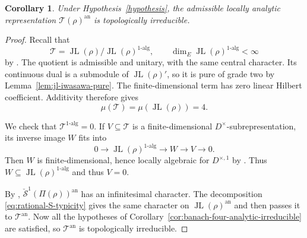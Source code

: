 \documentclass[11pt]{article}
\newtheorem{corollary}[theorem]{Corollary}
\theoremstyle{definition}
\newcommand{\JL}{\operatorname{JL}}
\newcommand{\Tau}{\mathcal T}
\begin{document}
\begin{corollary}\label{thm:tau-analytic-irreducible}
Under Hypothesis~\ref{hypothesis}, the admissible
locally analytic representation $\Tau(\rho)^{\mathrm{an}}$ is
topologically irreducible.
\end{corollary}
\begin{proof}
Recall that
\[
 \Tau=\JL(\rho)/\JL(\rho)^{1\text{-}\mathrm{alg}},
 \qquad \dim_E\JL(\rho)^{1\text{-}\mathrm{alg}}<\infty
\]
by \cite[Theorem~4.23]{LiuWang2025}. The quotient is admissible
and unitary, with the same central character. Its continuous
dual is a submodule of $\JL(\rho)'$, so it is pure of grade two
by Lemma~\ref{lem:jl-iwasawa-pure}. The finite-dimensional term
has zero linear Hilbert coefficient. Additivity therefore gives
\[
 \mu(\Tau)=\mu(\JL(\rho))=4.
\]

We check that $\Tau^{1\text{-}\mathrm{alg}}=0$.
If $V\subseteq\Tau$ is a finite-dimensional
$D^\times$-subrepresentation, its inverse image $W$ fits into
\[
 0\longrightarrow\JL(\rho)^{1\text{-}\mathrm{alg}}
 \longrightarrow W\longrightarrow V\longrightarrow0.
\]
Then $W$ is finite-dimensional, hence locally algebraic for
$D^{\times,1}$ by \cite[Lemma~4.22]{LiuWang2025}.
Thus $W\subseteq\JL(\rho)^{1\text{-}\mathrm{alg}}$ and thus $V=0$.

By \cite[Corollary~8.16]{DPS23},
$\check{\mathcal S}^1(\Pi(\rho))^{\mathrm{an}}$ has an
infinitesimal character. The decomposition
\eqref{eq:rational-S-typicity} gives the same character on
$\JL(\rho)^{\mathrm{an}}$ and then passes it to $\Tau^{\mathrm{an}}$.
Now all the hypotheses of
Corollary~\ref{cor:banach-four-analytic-irreducible} are satisfied,
so $\Tau^{\mathrm{an}}$ is topologically irreducible.
\end{proof}

\printbibliography[heading=bibintoc]
\end{document}
